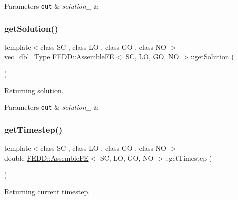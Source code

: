 \begin{DoxyParams}[1]{Parameters}
\mbox{\tt out}  & {\em solution\+\_\+} & \\
\hline
\end{DoxyParams}
\mbox{\label{classFEDD_1_1AssembleFE_a33e83a1eb6656a74609dfbfaf3fae474}} 
\subsubsection{\texorpdfstring{get\+Solution()}{getSolution()}}
{\footnotesize\ttfamily template$<$class SC , class LO , class GO , class NO $>$ \\
vec\+\_\+dbl\+\_\+\+Type \hyperlink{classFEDD_1_1AssembleFE}{F\+E\+D\+D\+::\+Assemble\+FE}$<$ SC, LO, GO, NO $>$\+::get\+Solution (\begin{DoxyParamCaption}{ }\end{DoxyParamCaption})}



Returning solution. 


\begin{DoxyParams}[1]{Parameters}
\mbox{\tt out}  & {\em solution\+\_\+} & \\
\hline
\end{DoxyParams}
\mbox{\label{classFEDD_1_1AssembleFE_ab6cc0ce0c63df078ee4b6d93b93d928d}} 
\subsubsection{\texorpdfstring{get\+Timestep()}{getTimestep()}}
{\footnotesize\ttfamily template$<$class SC , class LO , class GO , class NO $>$ \\
double \hyperlink{classFEDD_1_1AssembleFE}{F\+E\+D\+D\+::\+Assemble\+FE}$<$ SC, LO, GO, NO $>$\+::get\+Timestep (\begin{DoxyParamCaption}{ }\end{DoxyParamCaption})}



Returning current timestep. 


